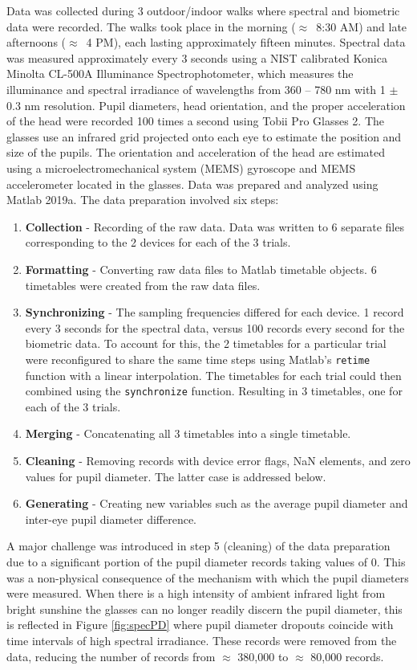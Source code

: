 \documentclass[10pt]{article}
\begin{document}
Data was collected during 3 outdoor/indoor walks where spectral and biometric data were recorded. The walks took place in the morning ($\approx$~8:30 AM) and late afternoons ($\approx$~4 PM), each lasting approximately fifteen minutes. Spectral data was measured approximately every 3 seconds using a NIST calibrated Konica Minolta CL-500A Illuminance Spectrophotometer, which measures the illuminance and spectral irradiance of wavelengths from 360 -- 780 nm with 1 $\pm$ 0.3 nm resolution. Pupil diameters, head orientation, and the proper acceleration of the head were recorded 100 times a second using Tobii Pro Glasses 2. The glasses use an infrared grid projected onto each eye to estimate the position and size of the pupils. The orientation and acceleration of the head are estimated using a microelectromechanical system (MEMS) gyroscope and MEMS accelerometer located in the glasses. Data was prepared and analyzed using Matlab 2019a. The data preparation involved six steps: 
\begin{enumerate}
    \item \textbf{Collection} - Recording of the raw data. Data was written to 6 separate files corresponding to the 2 devices for each of the 3 trials. 
    \item \textbf{Formatting} - Converting raw data files to Matlab timetable objects. 6 timetables were created from the raw data files.
    \item \textbf{Synchronizing} - The sampling frequencies differed for each device. 1 record every 3 seconds for the spectral data, versus 100 records every second for the biometric data. To account for this, the 2 timetables for a particular trial were reconfigured to share the same time steps using Matlab's \texttt{retime} function with a linear interpolation. The timetables for each trial could then combined using the \texttt{synchronize} function. Resulting in 3 timetables, one for each of the 3 trials. 
    \item \textbf{Merging} - Concatenating all 3 timetables into a single timetable. 
    \item \textbf{Cleaning} - Removing records with device error flags, NaN elements, and zero values for pupil diameter. The latter case is addressed below.
    \item \textbf{Generating} - Creating new variables such as the average pupil diameter and inter-eye pupil diameter difference.
\end{enumerate}

 \noindent A major challenge was introduced in step 5 (cleaning) of the data preparation due to a significant portion of the pupil diameter records taking values of 0. This was a non-physical consequence of the mechanism with which the pupil diameters were measured. When there is a high intensity of ambient infrared light from bright sunshine the glasses can no longer readily discern the pupil diameter, this is reflected in Figure \ref{fig:specPD} where pupil diameter dropouts coincide with time intervals of high spectral irradiance. These records were removed from the data, reducing the number of records from $\approx$ 380,000 to $\approx$ 80,000 records.
 
\end{document}
